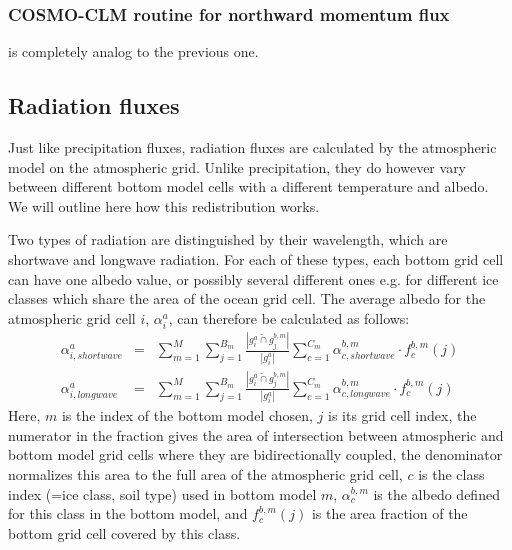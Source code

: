 \documentclass[a4paper,titlepage]{scrartcl}
\begin{document}
\subsubsection*{COSMO-CLM routine for northward momentum flux}
is completely analog to the previous one.

\newpage
\subsection{Radiation fluxes}
\label{sec:fluxes_radiation}

Just like precipitation fluxes, radiation fluxes are calculated by the atmospheric model on the atmospheric grid. Unlike precipitation, they do however vary between different bottom model cells with a different temperature and albedo. We will outline here how this redistribution works.

Two types of radiation are distinguished by their wavelength, which are shortwave and longwave radiation. For each of these types, each bottom grid cell can have one albedo value, or possibly several different ones e.g. for different ice classes which share the area of the ocean grid cell. The average albedo for the atmospheric grid cell $i$, $\alpha^a_i$, can therefore be calculated as follows:
\begin{eqnarray}
  \alpha^a_{i,shortwave} &=& \sum\limits_{m=1}^M \sum\limits_{j=1}^{B_m} \frac{\left| g^a_i \tilde{\cap} g^{b,m}_j \right|}{\left| g^a_i \right|} \sum\limits_{c=1}^{C_m} \alpha^{b,m}_{c,shortwave} \cdot f^{b,m}_c(j) \\
	\alpha^a_{i,longwave} &=& \sum\limits_{m=1}^M \sum\limits_{j=1}^{B_m} \frac{\left| g^a_i \tilde{\cap} g^{b,m}_j \right|}{\left| g^a_i \right|} \sum\limits_{c=1}^{C_m} \alpha^{b,m}_{c,longwave} \cdot f^{b,m}_c(j)
\end{eqnarray}
Here, $m$ is the index of the bottom model chosen, $j$ is its grid cell index, the numerator in the fraction gives the area of intersection between atmospheric and bottom model grid cells where they are bidirectionally coupled, the denominator normalizes this area to the full area of the atmospheric grid cell, $c$ is the class index (=ice class, soil type) used in bottom model $m$, $\alpha^{b,m}_{c}$ is the albedo defined for this class in the bottom model, and  $f^{b,m}_c(j)$ is the area fraction of the bottom grid cell covered by this class.
\end{document}
